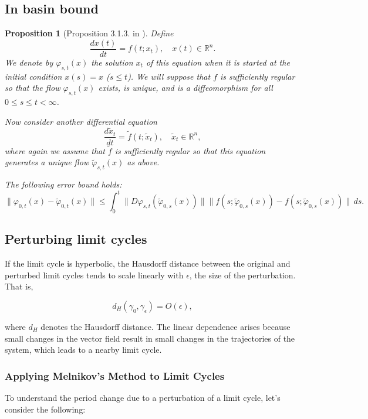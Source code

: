 \documentclass{article}
\newtheorem{proposition}{Proposition}
\theoremstyle{definition}
\theoremstyle{remark}
\begin{document}
\subsection{In basin bound}
\begin{proposition}[Proposition 3.1.3. in \citep{vanhandel2007filtering}]\label{prop:313}
Define 
\[
\frac{d x(t)}{d t} = f(t; x_t), \quad x(t) \in \mathbb{R}^n.
\]
We denote by $\varphi_{s,t}(x)$ the solution $x_t$ of this equation when it is started at the initial condition $x(s) = x$ ($s \leq t$). We will suppose that $f$ is sufficiently regular so that the flow $\varphi_{s,t}(x)$ exists, is unique, and is a diffeomorphism for all $0 \leq s \leq t < \infty$.

Now consider another differential equation 
\[
\frac{d \tilde{x}_t}{d t} = \tilde{f}(t; \tilde{x}_t), \quad \tilde{x}_t \in \mathbb{R}^n,
\]
where again we assume that $\tilde{f}$ is sufficiently regular so that this equation generates a unique flow $\tilde{\varphi}_{s,t}(x)$ as above.


The following error bound holds:
\[
\|\varphi_{0,t}(x) - \tilde{\varphi}_{0,t}(x)\| \leq \int_0^t \|D\varphi_{s,t}(\tilde{\varphi}_{0,s}(x))\| \|f(s; \tilde{\varphi}_{0,s}(x)) - f(s; \tilde{\varphi}_{0,s}(x))\| \, ds.
\]
\end{proposition}



\subsection{Perturbing limit cycles}
If the limit cycle is hyperbolic, the Hausdorff distance between the original and perturbed limit cycles tends to scale linearly with \(\epsilon\), the size of the perturbation. That is,

\[
d_H(\gamma_0, \gamma_\epsilon) = O(\epsilon),
\]

where \(d_H\) denotes the Hausdorff distance. The linear dependence arises because small changes in the vector field result in small changes in the trajectories of the system, which leads to a nearby limit cycle.


\subsubsection{Applying Melnikov’s Method to Limit Cycles}

To understand the period change due to a perturbation of a limit cycle, let’s consider the following:
\end{document}
